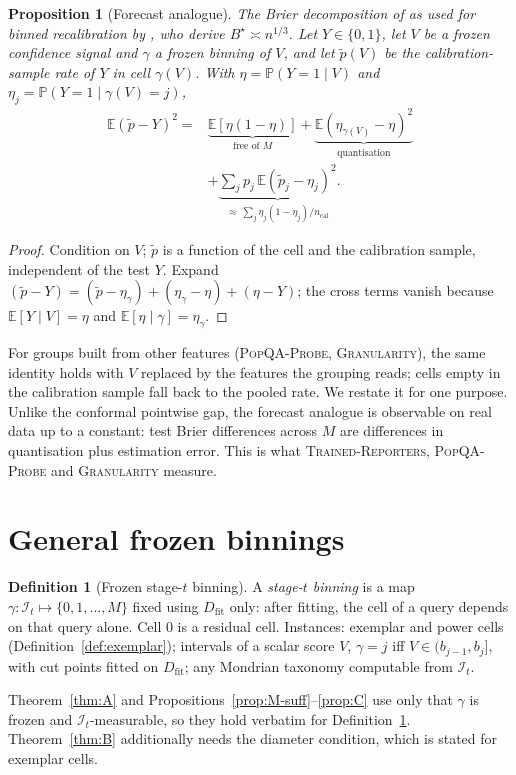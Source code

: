 \documentclass[twoside]{article}
\newtheorem{proposition}[theorem]{Proposition}
\theoremstyle{definition}
\newtheorem{definition}[theorem]{Definition}
\theoremstyle{remark}
\newcommand{\Dfit}{D_{\mathrm{fit}}}
\newcommand{\Info}{\mathcal{I}}
\newcommand{\E}{\mathbb{E}}
\renewcommand{\P}{\mathbb{P}}
\newcommand{\1}{\mathbf{1}}
\newcommand{\expname}[1]{\textsc{#1}}
\begin{document}
\begin{proposition}[Forecast analogue]
\label{prop:G}
The Brier decomposition of \citet{murphy1973new} as used for binned recalibration by
\citet{sun2023minimum}, who derive $B^\star\asymp n^{1/3}$. Let $Y\in\{0,1\}$, let $V$ be a frozen confidence signal and $\gamma$ a frozen binning of
$V$, and let $\tilde p(V)$ be the calibration-sample rate of $Y$ in cell $\gamma(V)$. With
$\eta=\P(Y=1\mid V)$ and $\eta_j=\P(Y=1\mid\gamma(V)=j)$,
\begin{align*}
  \E(\tilde p-Y)^2 = {}&\underbrace{\E[\eta(1-\eta)]}_{\text{free of }M}
  + \underbrace{\E(\eta_{\gamma(V)}-\eta)^2}_{\text{quantisation}}\\
  &+ \underbrace{\textstyle\sum_j p_j\,\E(\tilde p_j-\eta_j)^2}_{\approx\ \sum_j \eta_j(1-\eta_j)/n_{\mathrm{cal}}}.
\end{align*}
\end{proposition}
\begin{proof}
Condition on $V$; $\tilde p$ is a function of the cell and the calibration sample, independent of
the test $Y$. Expand $(\tilde p-Y)=(\tilde p-\eta_{\gamma})+(\eta_\gamma-\eta)+(\eta-Y)$; the cross
terms vanish because $\E[Y\mid V]=\eta$ and $\E[\eta\mid\gamma]=\eta_\gamma$.
\end{proof}
For groups built from other features (\expname{PopQA-Probe}, \expname{Granularity}), the same identity holds with $V$ replaced by
the features the grouping reads; cells empty in the calibration sample fall back to the pooled
rate. We restate it for one purpose. Unlike the conformal pointwise gap, the forecast analogue is
observable on real data up to a constant: test Brier differences across $M$ are differences in quantisation plus estimation
error. This is what \expname{Trained-Reporters}, \expname{PopQA-Probe} and \expname{Granularity} measure.

\section{General frozen binnings}
\label{app:binning}
\begin{definition}[Frozen stage-$t$ binning]
\label{def:binning}
A \emph{stage-$t$ binning} is a map $\gamma: \Info_t \mapsto \{0,1,\dots,M\}$ fixed using
$\Dfit$ only: after fitting, the cell of a query depends on that query alone. Cell $0$ is a
residual cell. Instances: exemplar and power cells (Definition~\ref{def:exemplar}); intervals
of a scalar score $V$, $\gamma=j$ iff $V\in(b_{j-1},b_j]$, with cut points fitted on $\Dfit$;
any Mondrian taxonomy computable from $\Info_t$.
\end{definition}
Theorem~\ref{thm:A} and Propositions~\ref{prop:M-suff}--\ref{prop:C} use only that $\gamma$ is
frozen and $\Info_t$-measurable, so they hold verbatim for Definition~\ref{def:binning}.
Theorem~\ref{thm:B} additionally needs the diameter condition, which is stated for exemplar
cells.
\end{document}
